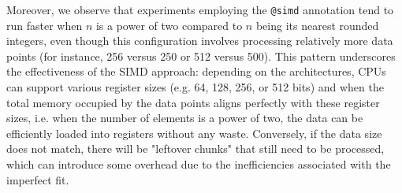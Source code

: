 \documentclass[12pt,	%
	a4paper,		%
	twoside,		%
	openright,		%
	titlepage,%
	]{book}
\theoremstyle{definition}
\newcommand{\mjline}[1]{\texttt{#1}}
\begin{document}
Moreover, we observe that experiments employing the \mjline{@simd} annotation tend to run faster when $n$ is a power of two compared to $n$ being its nearest rounded integers, even though this configuration involves processing relatively more data points (for instance, 256 versus 250 or 512 versus 500).
This pattern underscores the effectiveness of the SIMD approach: depending on the architectures, CPUs can support various register sizes (e.g. 64, 128, 256, or 512 bits) and when the total memory occupied by the data points aligns perfectly with these register sizes, i.e. when the number of elements is a power of two, the data can be efficiently loaded into registers without any waste. Conversely, if the data size does not match, there will be "leftover chunks" that still need to be processed, which can introduce some overhead due to the inefficiencies associated with the imperfect fit.
\end{document}
